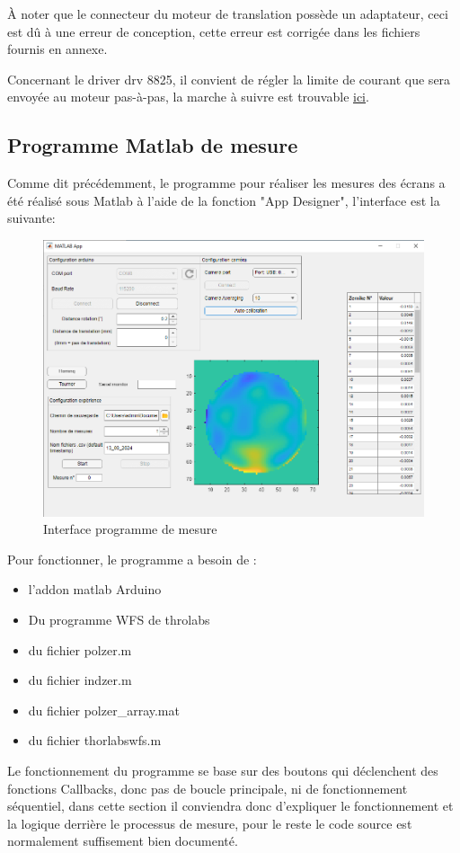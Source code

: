 À noter que le connecteur du moteur de translation possède un adaptateur, ceci est dû à une erreur de conception, cette erreur est corrigée
dans les fichiers fournis en annexe.

Concernant le driver drv 8825, il convient de régler la limite de courant que sera envoyée au moteur pas-à-pas, la marche à suivre est trouvable \href{https://www.pololu.com/product/2133}{ici}.\footnotemark


\subsection{Programme Matlab de mesure}
Comme dit précédemment, le programme pour réaliser les mesures des écrans a été réalisé sous Matlab à l'aide de la fonction "App Designer", l'interface est la suivante:
\begin{figure}[H]
    \centering
    \includegraphics[width = \textwidth]{assets/figures/ameliorations/capture interface.png}
    \caption{Interface programme de mesure}
\end{figure}
Pour fonctionner, le programme a besoin de :
\begin{itemize}
    \item l'addon matlab Arduino
    \item Du programme WFS de throlabs \cite{WFS_thorlabs_site}
    \item du fichier polzer.m
    \item du fichier indzer.m
    \item du fichier polzer\_array.mat
    \item du fichier thorlabswfs.m
\end{itemize}

Le fonctionnement du programme se base sur des boutons qui déclenchent des fonctions Callbacks, donc pas de boucle principale,
ni de fonctionnement séquentiel, dans cette section il conviendra donc d'expliquer le fonctionnement et la logique derrière le processus
de mesure, pour le reste le code source est normalement suffisement bien documenté.
\newpage

